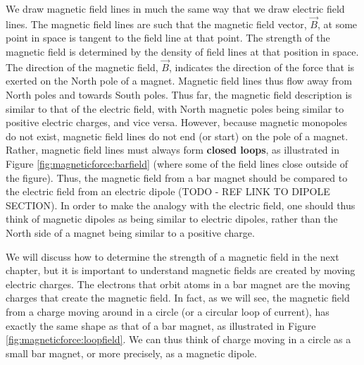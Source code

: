 We draw magnetic field lines in much the same way that we draw electric field lines. The magnetic field lines are such that the magnetic field vector, $\vec B$, at some point in space is tangent to the field line at that point. The strength of the magnetic field is determined by the density of field lines at that position in space. The direction of the magnetic field, $\vec B$, indicates the direction of the force that is exerted on the North pole of a magnet. Magnetic field lines thus flow away from North poles and towards South poles. Thus far, the magnetic field description is similar to that of the electric field, with North magnetic poles being similar to positive electric charges, and vice versa.  However, because magnetic monopoles do not exist, magnetic field lines do not end (or start) on the pole of a magnet. Rather, magnetic field lines must always form \textbf{closed loops}, as illustrated in Figure \ref{fig:magneticforce:barfield} (where some of the field lines close outside of the figure). Thus, the magnetic field from a bar magnet should be compared to the electric field from an electric dipole (TODO - REF LINK TO DIPOLE SECTION). In order to make the analogy with the electric field, one should thus think of magnetic dipoles as being similar to electric dipoles, rather than the North side of a magnet being similar to a positive charge. 

We will discuss how to determine the strength of a magnetic field in the next chapter, but it is important to understand magnetic fields are created by moving electric charges. The electrons that orbit atoms in a bar magnet are the moving charges that create the magnetic field. In fact, as we will see, the magnetic field from a charge moving around in a circle (or a circular loop of current), has exactly the same shape as that of a bar magnet, as illustrated in Figure \ref{fig:magneticforce:loopfield}. We can thus think of charge moving in a circle as a small bar magnet, or more precisely, as a magnetic dipole.

